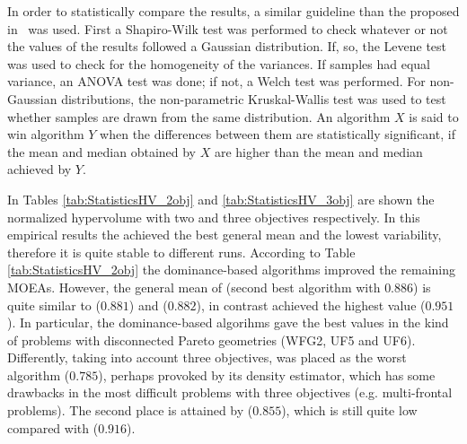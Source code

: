 %
In order to statistically compare the \HV{} results, a similar guideline than the proposed in~\cite{Joel:StatisticalTest} was used. 
%
First a Shapiro-Wilk test was performed to check whatever or not the values of the results followed a Gaussian distribution. 
%
If, so, the Levene test was used to check for the homogeneity of the variances. 
%
If samples had equal variance, an ANOVA test was done; if not, a Welch test was performed. 
%
For non-Gaussian distributions, the non-parametric Kruskal-Wallis test was used to test whether samples are drawn from the same distribution. 
%
An algorithm $X$ is said to win algorithm $Y$ when the differences between them are statistically significant, if the mean and median obtained by $X$ are higher than the mean and median achieved by $Y$.
%

In Tables \ref{tab:StatisticsHV_2obj} and \ref{tab:StatisticsHV_3obj} are shown the normalized hypervolume with two and three objectives respectively.
%
In this empirical results the \VSDMOEA{} achieved the best general mean and the lowest variability, therefore it is quite stable to different runs.
%
According to Table \ref{tab:StatisticsHV_2obj} the dominance-based algorithms improved the remaining MOEAs.
%
However, the general mean of \NSGAII{} (second best algorithm with $0.886$) is quite similar to \MOEAD{} ($0.881$) and \RMOEA{} ($0.882$), in contrast \VSDMOEA{} achieved the highest \HV{} value ($0.951$).
%
In particular, the dominance-based algorihms gave the best values in the kind of problems with disconnected Pareto geometries (WFG2, UF5 and UF6).
%
Differently, taking into account three objectives, \NSGAII{} was placed as the worst algorithm ($0.785$), perhaps provoked by its density estimator, which has some drawbacks in the most difficult problems with three objectives (e.g. multi-frontal problems).
%
The second place is attained by \RMOEA{} ($0.855$), which is still quite low compared with \VSDMOEA{} ($0.916$).
%


